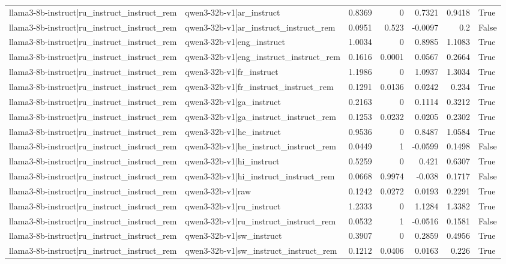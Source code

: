 \begin{table}
\begin{tabular}{l l r r r r l}
llama3-8b-instruct|ru_instruct_instruct_rem & qwen3-32b-v1|ar_instruct & 0.8369 & 0 & 0.7321 & 0.9418 & True \\
llama3-8b-instruct|ru_instruct_instruct_rem & qwen3-32b-v1|ar_instruct_instruct_rem & 0.0951 & 0.523 & -0.0097 & 0.2 & False \\
llama3-8b-instruct|ru_instruct_instruct_rem & qwen3-32b-v1|eng_instruct & 1.0034 & 0 & 0.8985 & 1.1083 & True \\
llama3-8b-instruct|ru_instruct_instruct_rem & qwen3-32b-v1|eng_instruct_instruct_rem & 0.1616 & 0.0001 & 0.0567 & 0.2664 & True \\
llama3-8b-instruct|ru_instruct_instruct_rem & qwen3-32b-v1|fr_instruct & 1.1986 & 0 & 1.0937 & 1.3034 & True \\
llama3-8b-instruct|ru_instruct_instruct_rem & qwen3-32b-v1|fr_instruct_instruct_rem & 0.1291 & 0.0136 & 0.0242 & 0.234 & True \\
llama3-8b-instruct|ru_instruct_instruct_rem & qwen3-32b-v1|ga_instruct & 0.2163 & 0 & 0.1114 & 0.3212 & True \\
llama3-8b-instruct|ru_instruct_instruct_rem & qwen3-32b-v1|ga_instruct_instruct_rem & 0.1253 & 0.0232 & 0.0205 & 0.2302 & True \\
llama3-8b-instruct|ru_instruct_instruct_rem & qwen3-32b-v1|he_instruct & 0.9536 & 0 & 0.8487 & 1.0584 & True \\
llama3-8b-instruct|ru_instruct_instruct_rem & qwen3-32b-v1|he_instruct_instruct_rem & 0.0449 & 1 & -0.0599 & 0.1498 & False \\
llama3-8b-instruct|ru_instruct_instruct_rem & qwen3-32b-v1|hi_instruct & 0.5259 & 0 & 0.421 & 0.6307 & True \\
llama3-8b-instruct|ru_instruct_instruct_rem & qwen3-32b-v1|hi_instruct_instruct_rem & 0.0668 & 0.9974 & -0.038 & 0.1717 & False \\
llama3-8b-instruct|ru_instruct_instruct_rem & qwen3-32b-v1|raw & 0.1242 & 0.0272 & 0.0193 & 0.2291 & True \\
llama3-8b-instruct|ru_instruct_instruct_rem & qwen3-32b-v1|ru_instruct & 1.2333 & 0 & 1.1284 & 1.3382 & True \\
llama3-8b-instruct|ru_instruct_instruct_rem & qwen3-32b-v1|ru_instruct_instruct_rem & 0.0532 & 1 & -0.0516 & 0.1581 & False \\
llama3-8b-instruct|ru_instruct_instruct_rem & qwen3-32b-v1|sw_instruct & 0.3907 & 0 & 0.2859 & 0.4956 & True \\
llama3-8b-instruct|ru_instruct_instruct_rem & qwen3-32b-v1|sw_instruct_instruct_rem & 0.1212 & 0.0406 & 0.0163 & 0.226 & True \\

\end{tabular}
\end{table}
